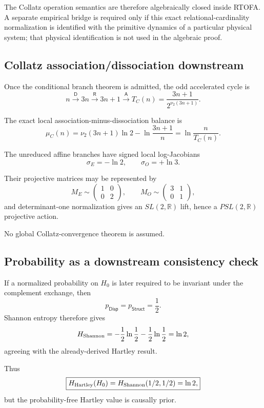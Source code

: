 \documentclass[11pt]{article}
\begin{document}
The Collatz operation semantics are therefore algebraically closed inside
RTOFA. A separate empirical bridge is required only if this exact
relational-cardinality normalization is identified with the primitive
dynamics of a particular physical system; that physical identification is not
used in the algebraic proof.

\subsection{Collatz association/dissociation downstream}

Once the conditional branch theorem is admitted, the odd accelerated cycle is
\[
n
\xrightarrow{\mathsf D}
3n
\xrightarrow{\mathsf R}
3n+1
\xrightarrow{\mathsf A}
T_C(n)
=
\frac{3n+1}{2^{\nu_2(3n+1)}}.
\]

The exact local association-minus-dissociation balance is
\[
\boxed{
\mu_C(n)
=
\nu_2(3n+1)\ln2
-
\ln\frac{3n+1}{n}
=
\ln\frac{n}{T_C(n)}.
}
\]

The unreduced affine branches have signed local log-Jacobians
\[
\boxed{
\sigma_E=-\ln2,
\qquad
\sigma_O=+\ln3.
}
\]

Their projective matrices may be represented by
\[
M_E\sim
\begin{pmatrix}
1&0\\
0&2
\end{pmatrix},
\qquad
M_O\sim
\begin{pmatrix}
3&1\\
0&1
\end{pmatrix},
\]
and determinant-one normalization gives an \(SL(2,\mathbb R)\) lift, hence a
\(PSL(2,\mathbb R)\) projective action.

No global Collatz-convergence theorem is assumed.

\subsection{Probability as a downstream consistency check}

If a normalized probability on \(H_0\) is later required to be invariant under
the complement exchange, then
\[
p_{\mathsf{Disp}}
=
p_{\mathsf{Struct}}
=
\frac12.
\]
Shannon entropy therefore gives \cite{Shannon1948}
\[
H_{\rm Shannon}
=
-\frac12\ln\frac12
-\frac12\ln\frac12
=
\ln2,
\]
agreeing with the already-derived Hartley result.

Thus
\[
\boxed{
H_{\rm Hartley}(H_0)
=
H_{\rm Shannon}(1/2,1/2)
=
\ln2,
}
\]
but the probability-free Hartley value is causally prior.
\end{document}

